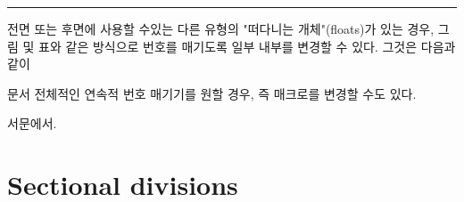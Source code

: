 \fancybreak{}


전면 또는 후면에 사용할 수있는 다른 유형의 "떠다니는 개체"(floats)가 있는 경우, 그림 및 표와 같은 방식으로 번호를 매기도록 일부 내부를 변경할 수 있다.
그것은 다음과 같이

\begin{lcode}
\newcommand\@memfront@floats{%
  \counterwithout{figure}{chapter}
  \counterwithout{table}{chapter}}
\newcommand\@memmain@floats{%
   \counterwithin{figure}{chapter}
   \counterwithin{table}{chapter}}
\newcommand\@memback@floats{%
    \counterwithout{figure}{chapter}
    \counterwithout{table}{chapter}
    \setcounter{figure}{0}
    \setcounter{table}{0}}
\end{lcode}
%
문서 전체적인 연속적 번호 매기기를 원할 경우, 즉 매크로를 변경할 수도 있다.
\begin{lcode}
\makeatletter
{}
\renewcommand\@memfront@floats{}
\renewcommand\@memmain@floats{}
\newcommand\@memback@floats{}
\makeatother
\end{lcode}
서문에서.




\section{Sectional divisions}

